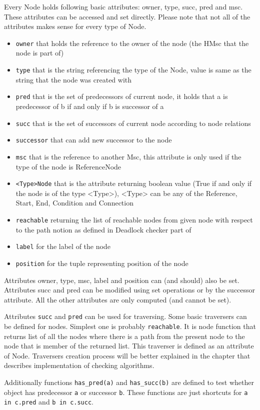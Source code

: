 \documentclass[11pt,oneside]{fithesis2}
\newcommand{\T}[1]{\texttt{#1}}
\newcommand{\ite}[1]{\item{\texttt{#1}}}
\begin{document}
Every Node holds following basic attributes: owner, type, succ, pred and msc. These attributes can be accessed and set directly. Please note that not all of the attributes makes sense for every type of Node.
\begin{itemize}
\item{\texttt{owner}} that holds the reference to the owner of the node (the HMsc that the node is part of)
\item{\texttt{type}} that is the string referencing the type of the Node, value is same as the string that the node was created with
\item{\texttt{pred}} that is the set of predecessors of current node, it holds that a is predecessor of b if and only if b is successor of a
\item{\texttt{succ}} that is the set of successors of current node according to node relations
\ite{successor} that can add new successor to the node
\item{\texttt{msc}} that is the reference to another Msc, this attribute is only used if the type of the node is ReferenceNode
\ite{<Type>Node} that is the attribute returning boolean value (True if and only if the node is of the type <Type>), <Type> can be any of the Reference, Start, End, Condition and Connection
\ite{reachable} returning the list of reachable nodes from given node with respect to the path notion as defined in Deadlock checker part of \cite{babica}
\ite{label} for the label of the node
\ite{position} for the tuple representing position of the node
\end{itemize}

Attributes owner, type, msc, label and position can (and should) also be set. Attributes succ and pred can be modified using set operations or by the successor attribute. All the other attributes are only computed (and cannot be set).

Attributes \T{succ} and \T{pred} can be used for traversing. Some basic traversers can be defined for nodes. Simplest one is probably \T{reachable}. It is node function that returns list of all the nodes where there is a path from the present node to the node that is member of the returned list. This traverser is defined as an attribute of Node. Traversers creation process will be better explained in the chapter that describes implementation of checking algorithms.

Additionally functions \T{has\_pred(a)} and \T{has\_succ(b)} are defined to test whether object has predecessor \T{a} or successor \T{b}. These functions are just shortcuts for \T{a in c.pred} and \T{b in c.succ}.
\end{document}
